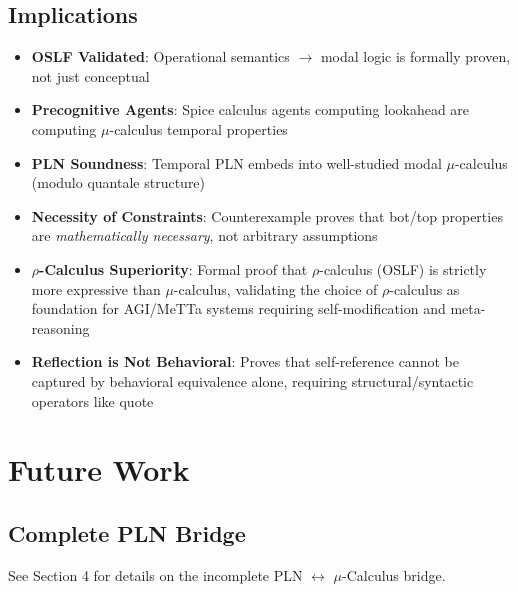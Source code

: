 \documentclass[11pt]{article}
\begin{document}
\subsection{Implications}

\begin{itemize}
\item \textbf{OSLF Validated}: Operational semantics $\to$ modal logic is formally proven, not just conceptual
\item \textbf{Precognitive Agents}: Spice calculus agents computing lookahead are computing $\mu$-calculus temporal properties
\item \textbf{PLN Soundness}: Temporal PLN embeds into well-studied modal $\mu$-calculus (modulo quantale structure)
\item \textbf{Necessity of Constraints}: Counterexample proves that bot/top properties are \emph{mathematically necessary}, not arbitrary assumptions
\item \textbf{$\rho$-Calculus Superiority}: Formal proof that $\rho$-calculus (OSLF) is strictly more expressive than $\mu$-calculus, validating the choice of $\rho$-calculus as foundation for AGI/MeTTa systems requiring self-modification and meta-reasoning
\item \textbf{Reflection is Not Behavioral}: Proves that self-reference cannot be captured by behavioral equivalence alone, requiring structural/syntactic operators like quote
\end{itemize}

\section{Future Work}

\subsection{Complete PLN Bridge}
See Section 4 for details on the incomplete PLN $\leftrightarrow$ $\mu$-Calculus bridge.
\end{document}
